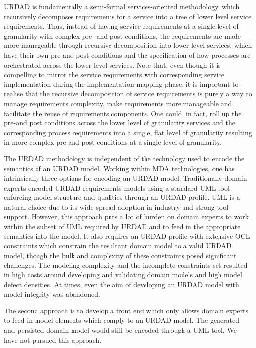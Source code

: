 URDAD is fundamentally a semi-formal services-oriented methodology, which recursively decomposes requirements for a service into a tree of lower level service requirements. Thus, instead of having service requirements at a single level of granularity with complex pre- and post-conditions, the requirements are made more manageable through recursive decomposition into lower level services, which have their own pre-and post conditions and the specification of how processes are orchestrated across the lower level services. Note that, even though it is compelling to mirror the service requirements with corresponding service implementation during the implementation mapping phase, it is important to realise that the recursive decomposition of service requirements is purely a way to manage requirements complexity, make requirements more manageable and facilitate the reuse of requirements components. One could, in fact, roll up the pre-and post conditions across the lower level of granularity services and the corresponding process requirements into a single, flat level of granularity resulting in more complex pre-and post-conditions at a single level of granularity.

The URDAD methodology is independent of the technology used to encode the semantics of an URDAD model. Working within MDA technologies, one has intrinsically three options for encoding an URDAD model. Traditionally domain experts encoded URDAD requirements models using a standard UML tool enforcing model structure and qualities through an URDAD profile. UML is a natural choice due to its wide spread adoption in industry and strong tool support. However, this approach puts a lot of burden on domain experts to work within the subset of UML required by URDAD and to feed in the appropriate semantics into the model. It also requires an URDAD profile with extensive OCL constraints which constrain the resultant domain model to a valid URDAD model, though the bulk and complexity of these constraints posed significant challenges. The modeling complexity and the incomplete constraints set resulted in high costs around developing and validating domain models and high model defect densities. At times, even the aim of developing an URDAD model with model integrity was abandoned.

The second approach is to develop a front end which only allows domain experts to feed in model elements which comply to an URDAD model. The generated and persisted domain model would still be encoded through a UML tool. We have not pursued this approach.

